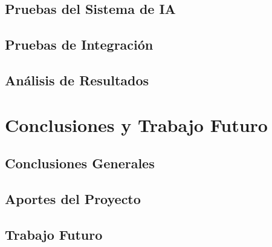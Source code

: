\documentclass[a4paper,12pt]{report}
\begin{document}
\section{Pruebas del Sistema de IA}






\section{Pruebas de Integración}




\section{Análisis de Resultados}




\chapter{Conclusiones y Trabajo Futuro}

\section{Conclusiones Generales}




\section{Aportes del Proyecto}



\section{Trabajo Futuro}



\end{document}
